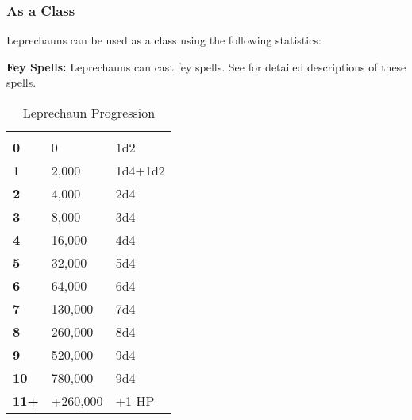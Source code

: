 \begin{multicols*}{2}
\subsubsection{As a Class}
Leprechauns can be used as a class using the following statistics:

\textbf{Fey Spells:} Leprechauns can cast fey spells. See  for detailed descriptions of these spells.


\begin {table}[H]
  \caption{Leprechaun Progression}
  \begin{tabularx}{\columnwidth}{>{\bfseries}YYY}
	 &  & \\
	0 & 0 & 1d2\\
	1 & 2,000 & 1d4+1d2\\
	2 & 4,000 & 2d4\\
	3 & 8,000 & 3d4\\
	4 & 16,000 & 4d4\\
	5 & 32,000 & 5d4\\
	6 & 64,000 & 6d4\\
	7 & 130,000 & 7d4\\
	8 & 260,000 & 8d4\\
	9 & 520,000 & 9d4\\
	10 & 780,000 & 9d4\\
	11+ & +260,000 & +1 HP
  \end {tabularx}
\end {table}



\end{multicols*}
